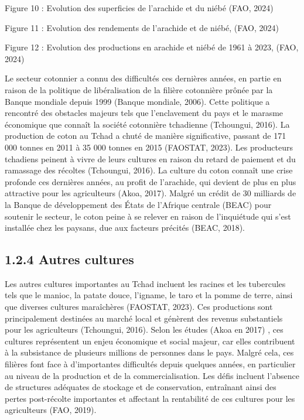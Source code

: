 \documentclass[12pt,oneside]{report}
\begin{document}
Figure 10 : Evolution des superficies de l’arachide et du niébé (FAO, 2024)

Figure 11 : Evolution des rendements de l’arachide et de niébé, (FAO, 2024)

Figure 12 : Evolution des productions en arachide et niébé de 1961 à 2023, (FAO, 2024)

Le secteur cotonnier a connu des difficultés ces dernières années, en partie en raison de la politique de libéralisation de la filière cotonnière prônée par la Banque mondiale depuis 1999 (Banque mondiale, 2006). Cette politique a rencontré des obstacles majeurs tels que l'enclavement du pays et le marasme économique que connaît la société cotonnière tchadienne (Tchoungui, 2016). La production de coton au Tchad a chuté de manière significative, passant de 171 000 tonnes en 2011 à 35 000 tonnes en 2015 (FAOSTAT, 2023). Les producteurs tchadiens peinent à vivre de leurs cultures en raison du retard de paiement et du ramassage des récoltes (Tchoungui, 2016). La culture du coton connaît une crise profonde ces dernières années, au profit de l'arachide, qui devient de plus en plus attractive pour les agriculteurs (Akoa, 2017). Malgré un crédit de 30 milliards de la Banque de développement des États de l'Afrique centrale (BEAC) pour soutenir le secteur, le coton peine à se relever en raison de l'inquiétude qui s'est installée chez les paysans, due aux facteurs précités (BEAC, 2018).

\subsection{1.2.4 Autres cultures}
Les autres cultures importantes au Tchad incluent les racines et les tubercules tels que le manioc, la patate douce, l'igname, le taro et la pomme de terre, ainsi que diverses cultures maraîchères (FAOSTAT, 2023). Ces productions sont principalement destinées au marché local et génèrent des revenus substantiels pour les agriculteurs (Tchoungui, 2016). Selon les études (Akoa en 2017) , ces cultures représentent un enjeu économique et social majeur, car elles contribuent à la subsistance de plusieurs millions de personnes dans le pays. Malgré cela, ces filières font face à d'importantes difficultés depuis quelques années, en particulier au niveau de la production et de la commercialisation. Les défis incluent l'absence de structures adéquates de stockage et de conservation, entraînant ainsi des pertes post-récolte importantes et affectant la rentabilité de ces cultures pour les agriculteurs (FAO, 2019).
\end{document}
